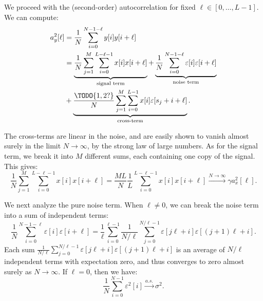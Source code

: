 \documentclass[9pt,twocolumn,twoside,lineno]{pnas-new}
\begin{document}
We proceed with the (second-order) autocorrelation for fixed $\ell\in[0,\ldots,L-1]$. We can compute:
%
\begin{align*}
%
a_y^2[\ell] & = \frac{1}{N}\sum_{i=0}^{N-1-\ell}y[i]y[i+\ell]
\nonumber \\
& = \underbrace{\frac{1}{N}\sum_{j=1}^{M}\sum_{i=0}^{L-\ell-1}x[i]x[i+\ell]}_{\text{signal term}} + \underbrace{\frac{1}{N}\sum_{i=0}^{N-1-\ell}\varepsilon[i]\varepsilon[i+\ell]}_{\text{noise term}}
\\ & + \underbrace{\frac{\TODO{1,2?}}{N} \sum_{j=1}^{M} \sum_{i=0}^{L-1} x[i] \varepsilon[s_j + i + \ell]}_{\text{cross-term}}. 
%
\end{align*}

The cross-terms are linear in the noise, and are easily shown to vanish almost surely in the limit $N\to\infty$, by the strong law of large numbers. As for the signal term, we break it into $M$ different sums, each containing one copy of the signal. This gives:
%
\begin{equation} \label{eq:2nd_moment_signal_term}
%
\frac{1}{N}\sum_{j=1}^{M}\sum_{i=0}^{L-\ell-1}x[i]x[i+\ell] = \frac{ML}{N}\frac{1}{L}\sum_{i=0}^{L-\ell-1}x[i]x[i+\ell]\xrightarrow{N\to\infty}\gamma a_x^2[\ell].
%
\end{equation}
%

We next analyze the pure noise term. When $\ell\neq 0$, we can break the noise term into a sum of independent terms:
%
\begin{equation}
%
\frac{1}{N}\sum_{i=0}^{N-1-\ell} \varepsilon[i]\varepsilon[i+\ell] = \frac{1}{\ell}\sum_{i=0}^{\ell-1}\frac{1}{N/\ell}\sum_{j=0}^{N/\ell -1} \varepsilon[j\ell + i] \varepsilon[(j+1)\ell + i].
%
\end{equation}
%
Each sum $\frac{1}{N/\ell}\sum_{j=0}^{N/\ell -1} \varepsilon[j\ell + i] \varepsilon[(j+1)\ell + i]$ is an average of $N/\ell$ independent terms with expectation zero, and thus converges to zero almost surely as $N\to\infty$. If $\ell=0$, then we have:
%
\begin{equation}
%
\frac{1}{N}\sum_{i=0}^{N-1} \varepsilon^2[i] \xrightarrow{a.s.} \sigma^2.
%
\end{equation}
\end{document}
